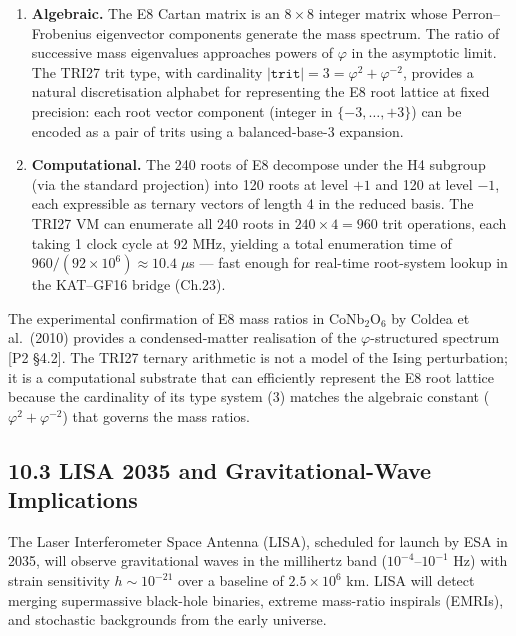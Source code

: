 \begin{enumerate}
\item \textbf{Algebraic.} The E8 Cartan matrix is an $8 \times 8$
integer matrix whose Perron--Frobenius eigenvector components generate
the mass spectrum. The ratio of successive mass eigenvalues approaches
powers of $\varphi$ in the asymptotic limit. The TRI27 trit type, with
cardinality $|\texttt{trit}| = 3 = \varphi^2 + \varphi^{-2}$, provides
a natural discretisation alphabet for representing the E8 root lattice
at fixed precision: each root vector component (integer in $\{-3,
\ldots, +3\}$) can be encoded as a pair of trits using a balanced-base-3
expansion.

\item \textbf{Computational.} The 240 roots of E8 decompose under the
H4 subgroup (via the standard projection) into 120 roots at level $+1$
and 120 at level $-1$, each expressible as ternary vectors of length 4
in the reduced basis. The TRI27 VM can enumerate all 240 roots in
$240 \times 4 = 960$ trit operations, each taking 1 clock cycle at
92 MHz, yielding a total enumeration time of
$960 / (92 \times 10^6) \approx 10.4\;\mu$s --- fast enough for
real-time root-system lookup in the KAT--GF16 bridge (Ch.23).
\end{enumerate}

The experimental confirmation of E8 mass ratios in CoNb$_2$O$_6$ by
Coldea et al.\ (2010) provides a condensed-matter realisation of the
$\varphi$-structured spectrum [P2 §4.2]. The TRI27 ternary arithmetic
is not a model of the Ising perturbation; it is a computational
substrate that can efficiently represent the E8 root lattice because the
cardinality of its type system ($3$) matches the algebraic constant
($\varphi^2 + \varphi^{-2}$) that governs the mass ratios.

\subsection{10.3 LISA 2035 and Gravitational-Wave
Implications}\label{fa_27:sec:lisa-2035}

The Laser Interferometer Space Antenna (LISA), scheduled for launch by
ESA in 2035, will observe gravitational waves in the millihertz band
($10^{-4}$--$10^{-1}$ Hz) with strain sensitivity
$h \sim 10^{-21}$ over a baseline of $2.5 \times 10^6$ km. LISA will
detect merging supermassive black-hole binaries, extreme mass-ratio
inspirals (EMRIs), and stochastic backgrounds from the early universe.

